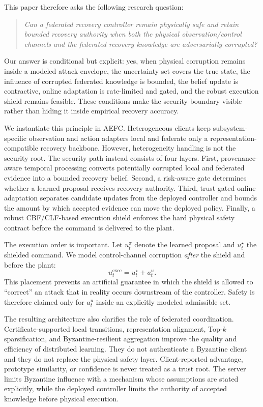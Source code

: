 This paper therefore asks the following research question:
\begin{quote}
\emph{Can a federated recovery controller remain physically safe and retain bounded recovery authority when both the physical observation/control channels and the federated recovery knowledge are adversarially corrupted?}
\end{quote}
Our answer is conditional but explicit: yes, when physical corruption remains inside a modeled attack envelope, the uncertainty set covers the true state, the influence of corrupted federated knowledge is bounded, the belief update is contractive, online adaptation is rate-limited and gated, and the robust execution shield remains feasible. These conditions make the security boundary visible rather than hiding it inside empirical recovery accuracy.

We instantiate this principle in AEFC. Heterogeneous clients keep subsystem-specific observation and action adapters local and federate only a representation-compatible recovery backbone. However, heterogeneity handling is not the security root. The security path instead consists of four layers. First, provenance-aware temporal processing converts potentially corrupted local and federated evidence into a bounded recovery belief. Second, a risk-aware gate determines whether a learned proposal receives recovery authority. Third, trust-gated online adaptation separates candidate updates from the deployed controller and bounds the amount by which accepted evidence can move the deployed policy. Finally, a robust CBF/CLF-based execution shield enforces the hard physical safety contract before the command is delivered to the plant.

The execution order is important. Let $u_t^{\pi}$ denote the learned proposal and $u_t^\star$ the shielded command. We model control-channel corruption \emph{after} the shield and before the plant:
\begin{equation}
u_t^{\mathrm{exec}}=u_t^\star+a_t^u.
\end{equation}
This placement prevents an artificial guarantee in which the shield is allowed to ``correct'' an attack that in reality occurs downstream of the controller. Safety is therefore claimed only for $a_t^u$ inside an explicitly modeled admissible set.

The resulting architecture also clarifies the role of federated coordination. Certificate-supported local transitions, representation alignment, Top-$k$ sparsification, and Byzantine-resilient aggregation improve the quality and efficiency of distributed learning. They do not authenticate a Byzantine client and they do not replace the physical safety layer. Client-reported advantage, prototype similarity, or confidence is never treated as a trust root. The server limits Byzantine influence with a mechanism whose assumptions are stated explicitly, while the deployed controller limits the authority of accepted knowledge before physical execution.

